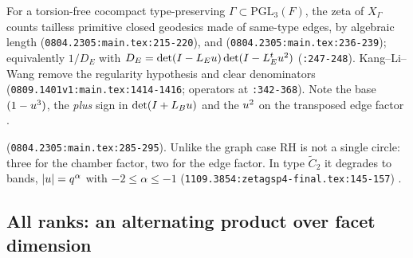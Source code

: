\begin{citedfact}
\label{cit:kl-identity}
\sloppy
For a torsion-free cocompact type-preserving $\Gamma\subset\mathrm{PGL}_3(F)$,
the zeta of $X_\Gamma$ counts tailless primitive closed geodesics made of
same-type edges, by algebraic length (\texttt{0804.2305:main.tex:215-220}), and
{\small\texttt{}}
(\texttt{0804.2305:main.tex:236-239}); equivalently $1/D_E$ with
$D_E = \det(I-L_Eu)\det(I-L_E^tu^2)$ (\texttt{:247-248}). Kang--Li--Wang
remove the regularity hypothesis and clear denominators
(\texttt{0809.1401v1:main.tex:1414-1416}; operators at \texttt{:342-368}). Note
the base $(1-u^3)$, the \emph{plus} sign in $\det(I+L_Bu)$ and the $u^2$ on
the transposed edge factor \cite{kangli2014zeta,kangliwang2010zeta}.
\end{citedfact}

\begin{citedfact}
\label{cit:kl-rh-four-way}
\sloppy
{\small\texttt{}}
(\texttt{0804.2305:main.tex:285-295}). Unlike the graph case RH is not a single
circle: three for the chamber factor, two for the edge factor. In type
$\tilde C_2$ it degrades to bands, $|u| = q^{\alpha}$ with $-2\le\alpha\le-1$ %
(\texttt{1109.3854:zetagsp4-final.tex:145-157}) \cite{fangliwang2013zeta}.
\end{citedfact}

\subsection{All ranks: an alternating product over facet dimension}

